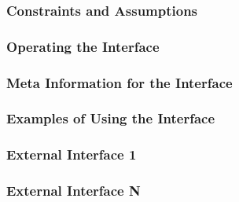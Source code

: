 \subsubsection{Constraints and Assumptions}

\subsubsection{Operating the Interface}
% 

\subsubsection{Meta Information for the Interface}

\subsubsection{Examples of Using the Interface}

\subsubsection{External Interface 1}

\subsubsection{External Interface N}
